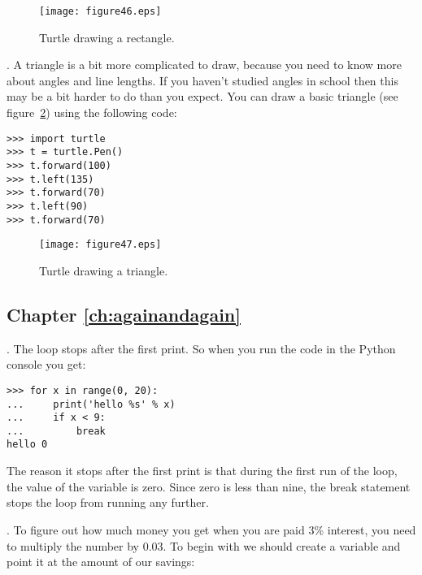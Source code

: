 \begin{figure}
\begin{center}
\texttt{[image: figure46.eps]}
\end{center}
\caption{Turtle drawing a rectangle.}\label{fig46}
\end{figure}

. A triangle is a bit more complicated to draw, because you need to know more about angles and line lengths.  If you haven't studied angles in school then this may be a bit harder to do than you expect.  You can draw a basic triangle (see figure~\ref{fig47}) using the following code:

\begin{listing}
\begin{verbatim}
>>> import turtle
>>> t = turtle.Pen()
>>> t.forward(100)
>>> t.left(135)
>>> t.forward(70)
>>> t.left(90)
>>> t.forward(70)
\end{verbatim}
\end{listing}

\begin{figure}
\begin{center}
\texttt{[image: figure47.eps]}
\end{center}
\caption{Turtle drawing a triangle.}\label{fig47}
\end{figure}


\subsection*{Chapter \ref{ch:againandagain}}

. The loop stops after the first print.  So when you run the code in the Python console you get:

\begin{listing}
\begin{verbatim}
>>> for x in range(0, 20):
...     print('hello %s' % x)
...     if x < 9:
...         break
hello 0
\end{verbatim}
\end{listing}

\noindent
The reason it stops after the first print is that during the first run of the loop, the value of the variable  is zero.  Since zero is less than nine, the break statement stops the loop from running any further.

. To figure out how much money you get when you are paid 3\% interest, you need to multiply the number by 0.03.  To begin with we should create a variable and point it at the amount of our savings:


